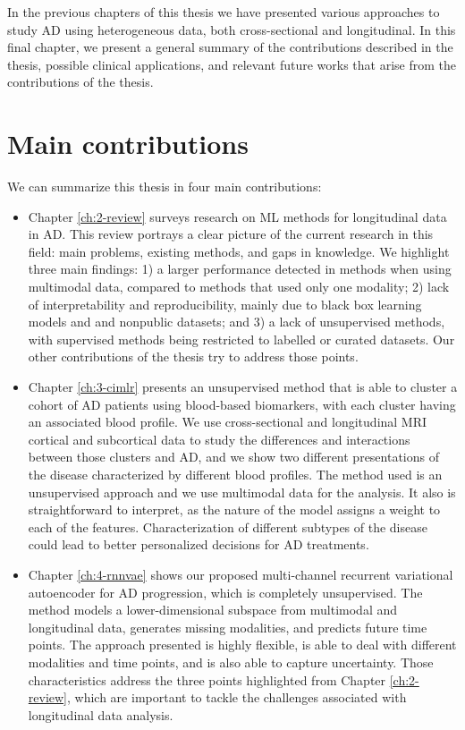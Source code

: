 In the previous chapters of this thesis we have presented various approaches to study AD using heterogeneous data, both cross-sectional and longitudinal. In this final chapter, we present a general summary of the contributions described in the thesis, possible clinical applications, and relevant future works that arise from the contributions of the thesis.

\section{Main contributions}

We can summarize this thesis in four main contributions:

\begin{itemize}
\item Chapter \ref{ch:2-review} surveys research on ML methods for longitudinal data in AD. This review portrays a clear picture of the current research in this field: main problems, existing methods, and gaps in knowledge. We highlight three main findings: 1) a larger performance detected in methods when using multimodal data, compared to methods that used only one modality; 2) lack of interpretability and reproducibility, mainly due to black box learning models and and nonpublic datasets; and 3) a lack of unsupervised methods, with supervised methods being restricted to labelled or curated datasets. Our other contributions of the thesis try to address those points.

\item Chapter \ref{ch:3-cimlr} presents an unsupervised method that is able to cluster a cohort of AD patients using blood-based biomarkers, with each cluster having an associated blood profile. We use cross-sectional and longitudinal MRI cortical and subcortical data to study the differences and interactions between those clusters and AD, and we show two different presentations of the disease characterized by different blood profiles. The method used is an unsupervised approach and we use multimodal data for the analysis. It also is straightforward to interpret, as the nature of the model assigns a weight to each of the features. Characterization of different subtypes of the disease could lead to better personalized decisions for AD treatments.

\item Chapter \ref{ch:4-rnnvae} shows our proposed multi-channel recurrent variational autoencoder for AD progression, which is completely unsupervised. The method models a lower-dimensional subspace from multimodal and longitudinal data, generates missing modalities, and predicts future time points. The approach presented is highly flexible, is able to deal with different modalities and time points, and is also able to capture uncertainty. Those characteristics address the three points highlighted from Chapter \ref{ch:2-review}, which are important to tackle the challenges associated with longitudinal data analysis.


\end{itemize}

